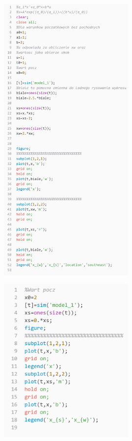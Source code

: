 \documentclass{article}
\begin{document}
\begin{figure}
    \centering
    \includegraphics[width=0.6\textwidth]{kod_x_0.png}
    \label{fig:my_label}
\end{figure}
\begin{figure}
    \centering
    \includegraphics[width=0.6\textwidth]{kod_x_2.png}
    \label{fig:my_label}
\end{figure}
\end{document}
